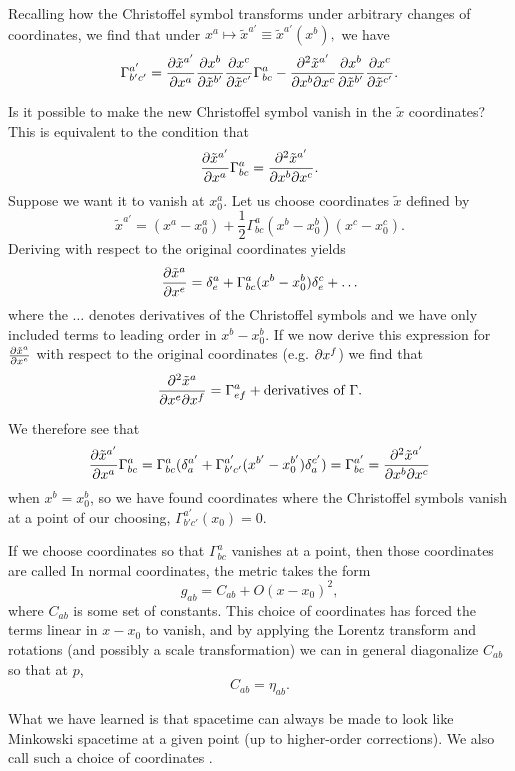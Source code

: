Recalling how the Christoffel symbol transforms under arbitrary changes of coordinates, we find that under $x^a \mapsto \tilde x^{a'}\equiv \tilde x^{a'}(x^b),$ we have
$$\Gamma^{a'}_{b'c'}= \frac{\p \tilde x^{a'}}{\p x^a}\frac{\p x^b}{\p \tilde x^{b'}}\frac{\p x^c}{\p \tilde x^{c'}}\Gamma^a_{bc}-\frac{\p^2 \tilde x^{a'}}{\p  x^{b} \p  x^{c}}\frac{\p x^b}{\p \tilde x^{b'}}\frac{\p x^c}{\p \tilde x^{c'}}.$$

Is it possible to make the new Christoffel symbol vanish in the $\tilde x$ coordinates? This is equivalent to the condition that
$$\frac{\p \tilde x^{a'}}{\p x^a} \Gamma^a_{bc}= \frac{\p^2 \tilde x^{a'}}{\p x^b \p x^c}.$$ Suppose we want it to vanish at $x^a_0$. Let us choose coordinates $\tilde x$ defined by
$$\tilde x^{a'}=(x^a-x^a_0)+\frac{1}{2}\Gamma^a_{bc}(x^b-x_0^b)(x^c-x^c_0).$$
Deriving with respect to the original coordinates yields
$$\frac{\p \tilde x^a}{\p x^e}=\delta^a_e +\Gamma^a_{bc}(x^b-x^b_0)\delta^c_e+\ldots$$ where the $\ldots$ denotes derivatives of the Christoffel symbols and we have only included terms to leading order in $x^b-x^b_0$. If we now derive this expression for $\P{\tilde x^a}{x^e}$ with respect to the original coordinates (e.g. $\p x^f$) we find that
$$\frac{\p^2 \tilde x^a}{\p x^e \p x^f}=\Gamma^a_{ef}+\text{derivatives of }\Gamma.$$

We therefore see that
$$\frac{\p \tilde x^{a'}}{\p x^a} \Gamma^a_{bc}= \Gamma^a_{bc} (\delta^{a'}_a +\Gamma^{a'}_{b'c'}(x^{b'}-x^{b'}_0)\delta^{c'}_a)=\Gamma^{a'}_{bc}= \frac{\p^2 \tilde x^{a'}}{\p x^b \p x^c}$$
when $x^b=x^b_0$, so we have found coordinates where the Christoffel symbols vanish at a point of our choosing, $\Gamma^{a'}_{b'c'}(x_0)=0$.

\begin{defn}
If we choose coordinates so that $\Gamma^a_{bc}$ vanishes at a point, then those coordinates are called  In normal coordinates, the metric takes the form
$$g_{ab}=C_{ab}+O(x-x_0)^2,$$
where $C_{ab}$ is some set of constants. This choice of coordinates has forced the terms linear in $x-x_0$ to vanish, and by applying the Lorentz transform and rotations (and possibly a scale transformation) we can in general diagonalize $C_{ab}$ so that at $p$,
$$C_{ab}=\eta_{ab}.$$
\end{defn}
What we have learned is that spacetime can always be made to look like Minkowski spacetime at a given point (up to higher-order corrections). We also call such a choice of coordinates .

